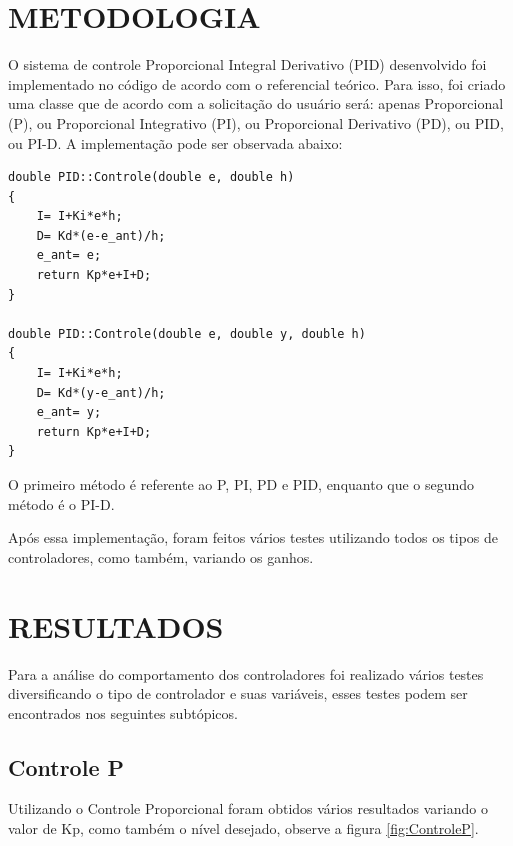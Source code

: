 \documentclass[a4paper,12pt]{article}
\begin{document}

\thispagestyle{main}

\section{METODOLOGIA}

\hspace{4ex}O sistema de controle Proporcional Integral Derivativo (PID) desenvolvido foi implementado no código de acordo com o referencial teórico. Para isso, foi criado uma classe que de acordo com a solicitação do usuário será: apenas Proporcional (P), ou Proporcional Integrativo (PI), ou Proporcional Derivativo (PD), ou PID, ou PI-D. A implementação pode ser observada abaixo:

\begin{lstlisting}
double PID::Controle(double e, double h)
{
    I= I+Ki*e*h;
    D= Kd*(e-e_ant)/h;
    e_ant= e;
    return Kp*e+I+D;
}

double PID::Controle(double e, double y, double h)
{
    I= I+Ki*e*h;
    D= Kd*(y-e_ant)/h;
    e_ant= y;
    return Kp*e+I+D;
}
\end{lstlisting}

\hspace{4ex}O primeiro método é referente ao P, PI, PD e PID, enquanto que o segundo método é o PI-D.

\hspace{4ex}Após essa implementação, foram feitos vários testes utilizando todos os tipos de controladores, como também, variando os ganhos.

\newpage


\thispagestyle{main}

\section{RESULTADOS}

\hspace{4ex}Para a análise do comportamento dos controladores foi realizado vários testes diversificando o tipo de controlador e suas variáveis, esses testes podem ser encontrados nos seguintes subtópicos.

\subsection{Controle P}
\hspace{4ex}Utilizando o Controle Proporcional foram obtidos vários resultados variando o valor de Kp, como também o nível desejado, observe a figura \ref{fig:ControleP}.
\end{document}
